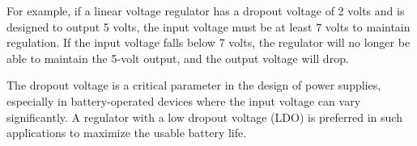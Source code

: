 For example, if a linear voltage regulator has a dropout voltage of 2 volts and is designed to output 5 volts, the input voltage must be at least 7 volts to maintain regulation. If the input voltage falls below 7 volts, the regulator will no longer be able to maintain the 5-volt output, and the output voltage will drop.

The dropout voltage is a critical parameter in the design of power supplies, especially in battery-operated devices where the input voltage can vary significantly. A regulator with a low dropout voltage (LDO) is preferred in such applications to maximize the usable battery life.

